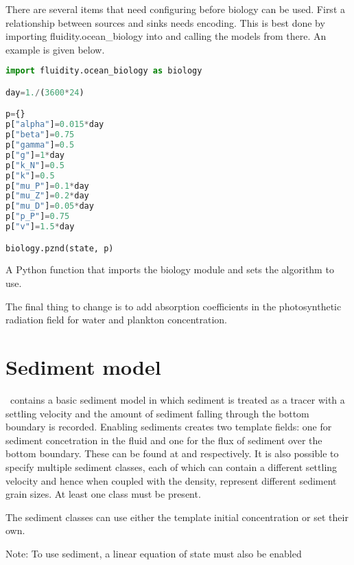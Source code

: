 There are several items that need configuring before biology can be used.
First a relationship between sources and sinks needs encoding. This is best
done by importing fluidity.ocean\_biology into
 and calling the
models from there. An example is given below.

\begin{example}
  \begin{lstlisting}[language=Python]
import fluidity.ocean_biology as biology

day=1./(3600*24)

p={}
p["alpha"]=0.015*day
p["beta"]=0.75
p["gamma"]=0.5
p["g"]=1*day
p["k_N"]=0.5
p["k"]=0.5
p["mu_P"]=0.1*day
p["mu_Z"]=0.2*day
p["mu_D"]=0.05*day
p["p_P"]=0.75
p["v"]=1.5*day

biology.pznd(state, p)  
  \end{lstlisting}
  \caption{A Python function that imports the biology module and sets the algorithm to use.}
\end{example}

The final thing to change is to add absorption coefficients in the photosynthetic radiation field for water and plankton concentration.

\section{Sediment model}
\label{config:sediments}

\fluidity\ contains a basic sediment model in which sediment is treated as a
tracer with a settling velocity and the amount of sediment falling through
the bottom boundary is recorded. Enabling sediments creates two template
fields: one for sediment concetration in the fluid and one for the flux of
sediment over the bottom boundary. These can be found at
 and
 respectively.
It is also possible to specify multiple sediment classes, each of which can
contain a different settling velocity and hence when coupled with the
density, represent different sediment grain sizes. At least one class must
be present.

The sediment classes can use either the template initial concentration or set their own.

Note: To use sediment, a linear equation of state must also be enabled 

